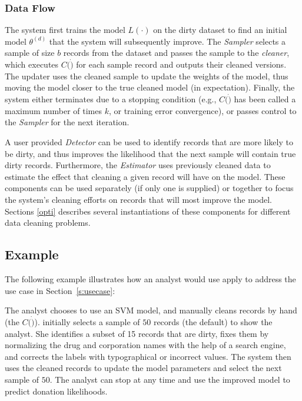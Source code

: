 \subsubsection{Data Flow} \label{df}
The system first trains the model $L(\cdot)$ on the dirty dataset to find an initial model $\theta^{(d)}$ that the system will subsequently improve.
The {\it Sampler} selects a sample of size $b$ records from the dataset and passes
the sample to the {\it cleaner}, which executes $C(\dot)$ for each sample record and outputs their cleaned versions.
The updater uses the cleaned sample to update the weights of the model, thus moving the model closer to the true cleaned model (in expectation).
Finally, the system either terminates due to a stopping condition (e.g., $C(\dot)$ has been called a maximum number of times $k$, or training error convergence),
or passes control to the {\it Sampler} for the next iteration.

A user provided {\it Detector} can be used to identify records that are more likely to be dirty, and  thus improves the likelihood that the next sample will contain true dirty records.
Furthermore, the {\it Estimator} uses previously cleaned data to estimate the effect that cleaning a given record will have on the model.
These components can be used separately (if only one is supplied) or together to focus the system's cleaning efforts on records that will most improve the model.
Sections \ref{opti} describes several instantiations of these components for different data cleaning problems.

\subsection{Example}
The following example illustrates how an analyst would use apply \sys to address the use case in Section~\ref{s:usecase}:
\begin{example}\label{archex}
The analyst chooses to use an SVM model, and manually cleans records by hand (the $C(\dot)$).  
\sys initially selects a sample of $50$ records (the default)  to show the analyst.
She identifies a subset of 15 records that are dirty, fixes them by normalizing the drug and corporation names with the help of a search engine, and corrects the labels with typographical or incorrect values.
The system then uses the cleaned records to update the model parameters and select the next sample of $50$.
The analyst can stop at any time and use the improved model to predict donation likelihoods.
\end{example}






